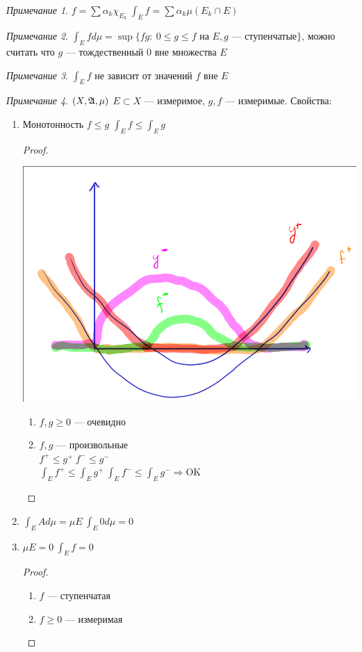 \documentclass[russ,oneside]{book}
\theoremstyle{plain}
\theoremstyle{remark}
\newtheorem*{remark}{Примечание}
\theoremstyle{definition}
\begin{document}
\begin{remark}
\(f = \sum \alpha_k \chi_{E_k}\ \int_E f = \sum \alpha_k \mu(E_k \cap E)\)
\end{remark}
\begin{remark}
\(\int_E f d\mu = \sup \{fg:\ 0 \le g \le f\text{ на } E, g\text{ --- ступенчатые}\}\), можно считать что \(g\) ---
тождественный 0 вне множества \(E\)
\end{remark}
\begin{remark}
\(\int_E f\) не зависит от значений \(f\) вне \(E\)
\end{remark}
\begin{remark}
\((X, \mathfrak{A}, \mu)\) \(E\subset X\) --- измеримое, \(g, f\) --- измеримые. Свойства:
\begin{enumerate}
\item \label{prop_3_1} Монотонность \(f \le g\) \(\int_E f \le \int_E g\)
\begin{proof}
\-
\begin{center}
\includegraphics[scale=0.3]{3_1.png}
\end{center}
\begin{enumerate}
\item \(f, g \ge 0\) --- очевидно
\item \(f, g\) --- произвольные \\
\(f^+ \le g^+\ f^- \le g^-\) \\
\(\int_E f^+ \le \int_E g^+\ \int_E f^- \le \int_E g^- \Rightarrow \text{OK}\)
\end{enumerate}
\end{proof}
\item \(\int_E Ad\mu = \mu E\ \int_E 0 d\mu = 0\)
\item \label{prop_3_3} \(\mu E = 0\ \int_E f= 0\)
\begin{proof}
\begin{enumerate}
\item \(f\) --- ступенчатая
\item \(f \ge 0\) --- измеримая
\end{enumerate}
\end{proof}


\end{enumerate}
\end{remark}
\end{document}
